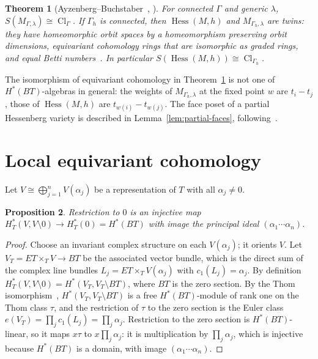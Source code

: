 \documentclass[11pt,a4paper]{article}
\numberwithin{equation}{section}
\theoremstyle{plain}
\newtheorem{theorem}{Theorem}[section]
\newtheorem{proposition}[theorem]{Proposition}
\theoremstyle{definition}
\theoremstyle{remark}
\newcommand{\HT}{H^{*}_{T}}
\DeclareMathOperator{\Hess}{Hess}
\DeclareMathOperator{\Cl}{Cl}
\begin{document}
\begin{theorem}[Ayzenberg--Buchstaber~{\cite[Thm.~1, Cor.~2.43]{AB24}}, \cite{AB21}]\label{thm:AB}
For connected $\Gamma$ and generic $\lambda$, $S(M_{\Gamma,\lambda})\cong\Cl_\Gamma$. If $\Gamma_h$ is connected, then $\Hess(M,h)$ and $M_{\Gamma_h,\lambda}$ are twins: they have homeomorphic orbit spaces by a homeomorphism preserving orbit dimensions, equivariant cohomology rings that are isomorphic as graded rings, and equal Betti numbers~\cite[Thm.~3.11]{AB21}. In particular $S(\Hess(M,h))\cong\Cl_{\Gamma_h}$.
\end{theorem}

The isomorphism of equivariant cohomology in Theorem~\ref{thm:AB} is not one of $H^*(BT)$-algebras in general: the weights of $M_{\Gamma_h,\lambda}$ at the fixed point $w$ are $t_i-t_j$, those of $\Hess(M,h)$ are $t_{w(i)}-t_{w(j)}$. The face poset of a partial Hessenberg variety is described in Lemma~\ref{lem:partial-faces}, following~\cite[Thm.~2]{AB24}.

\section{Local equivariant cohomology}\label{sec:local}

Let $V\cong\bigoplus_{j=1}^nV(\alpha_j)$ be a representation of $T$ with all $\alpha_j\neq0$.

\begin{proposition}\label{prop:sphere}
Restriction to $0$ is an injective map $\HT(V,V\setminus0)\to\HT(0)=H^*(BT)$ with image the principal ideal $(\alpha_1\cdots\alpha_n)$.
\end{proposition}

\begin{proof}
Choose an invariant complex structure on each $V(\alpha_j)$; it orients $V$. Let $V_T=ET\times_TV\to BT$ be the associated vector bundle, which is the direct sum of the complex line bundles $L_j=ET\times_TV(\alpha_j)$ with $c_1(L_j)=\alpha_j$. By definition $\HT(V,V\setminus0)=H^*(V_T,V_T\setminus BT)$, where $BT$ is the zero section. By the Thom isomorphism~\cite[Thm.~10.4]{MSt74}, $H^*(V_T,V_T\setminus BT)$ is a free $H^*(BT)$-module of rank one on the Thom class $\tau$, and the restriction of $\tau$ to the zero section is the Euler class $e(V_T)=\prod_jc_1(L_j)=\prod_j\alpha_j$. Restriction to the zero section is $H^*(BT)$-linear, so it maps $x\tau$ to $x\prod_j\alpha_j$: it is multiplication by $\prod_j\alpha_j$, which is injective because $H^*(BT)$ is a domain, with image $(\alpha_1\cdots\alpha_n)$.
\end{proof}
\end{document}
